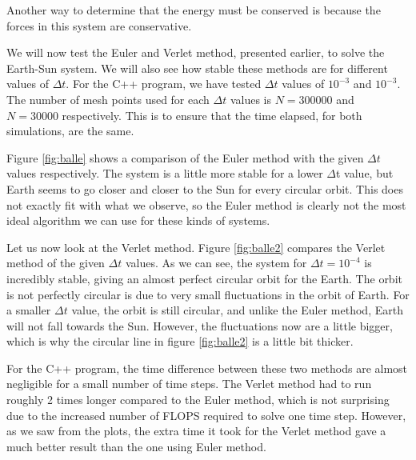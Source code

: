 \documentclass[12pt]{article}
\begin{document}
Another way to determine that the energy must be conserved is because the forces in this system are conservative.


We will now test the Euler and Verlet method, presented earlier, to solve the Earth-Sun system. We will also see how stable these methods are for different values of $\Delta t$. For the C++ program, we have tested $\Delta t$ values of $10^{-3}$ and $10^{-3}$. The number of mesh points used for each $\Delta t$ values is $N = 300 000$ and $N=30 000$ respectively. This is to ensure that the time elapsed, for both simulations, are the same.

Figure \ref{fig:balle} shows a comparison of the Euler method with the given $\Delta t$ values respectively. The system is a little more stable for a lower $\Delta $t value, but Earth seems to go closer and closer to the Sun for every circular orbit. This does not exactly fit with what we observe, so the Euler method is clearly not the most ideal algorithm we can use for these kinds of systems.

Let us now look at the Verlet method. Figure \ref{fig:balle2} compares the Verlet method of the given $\Delta t$ values. As we can see, the system for $\Delta t = 10^{-4}$ is incredibly stable, giving an almost perfect circular orbit for the Earth. The orbit is not perfectly circular is due to very small fluctuations in the orbit of Earth. For a smaller $\Delta t$ value, the orbit is still circular, and unlike the Euler method, Earth will not fall towards the Sun. However, the fluctuations now are a little bigger, which is why the circular line in figure \ref{fig:balle2} is a little bit thicker. 


For the C++ program, the time difference between these two methods are almost negligible for a small number of time steps. The Verlet method had to run roughly 2 times longer compared to the Euler method, which is not surprising due to the increased number of FLOPS required to solve one time step. However, as we saw from the plots, the extra time it took for the Verlet method gave a much better result than the one using Euler method.
\end{document}
